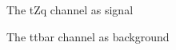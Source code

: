 \begin{frame}{The tZq channel as signal}
    
\end{frame}

\begin{frame}{The ttbar channel as background}
    
\end{frame}